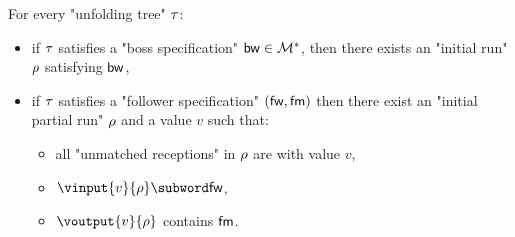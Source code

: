 \begin{lemma}
\label{lem:tree-to-run-technical}
For every "unfolding tree" $\tau$:
\begin{itemize}
	\item if $\tau$ satisfies a "boss specification" $\mathsf{bw} \in \mathcal{M}^*$, then there exists an "initial run" $\rho$ satisfying $\mathsf{bw}$,
	\item if $\tau$ satisfies a "follower specification" $(\mathsf{fw}, \mathsf{fm})$ then there exist an "initial partial run" $\rho$ and a value $v$ such that:
	\begin{itemize}
	\item all "unmatched receptions" in $\rho$ are with value $v$,
	\item $\vinput{v}{\run} \subword \followwordspec$, 
	\item $\voutput{v}{\run}$ contains $\mathsf{fm}$.
	\end{itemize}
\end{itemize}
\end{lemma}
